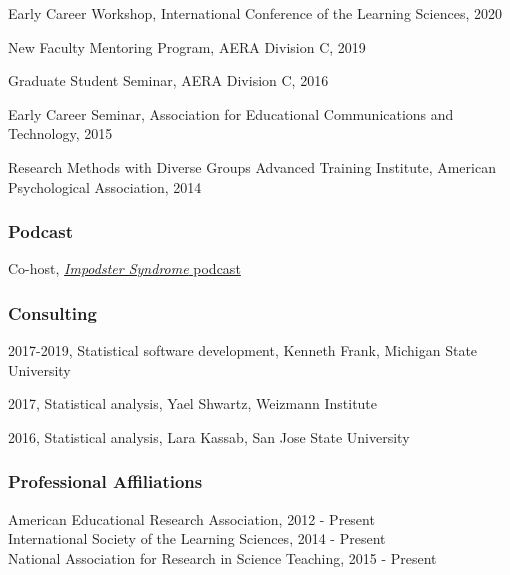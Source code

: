 \documentclass[
  11pt,
]{article}
\begin{document}
Early Career Workshop, International Conference of the Learning
Sciences, 2020

New Faculty Mentoring Program, AERA Division C, 2019

Graduate Student Seminar, AERA Division C, 2016

Early Career Seminar, Association for Educational Communications and
Technology, 2015

Research Methods with Diverse Groups Advanced Training Institute,
American Psychological Association, 2014

\hypertarget{podcast}{%
\subsubsection{Podcast}\label{podcast}}

Co-host, \href{http://impodstersyndrome.libsyn.com/}{\emph{Impodster
Syndrome} podcast}

\hypertarget{consulting}{%
\subsubsection{Consulting}\label{consulting}}

2017-2019, Statistical software development, Kenneth Frank, Michigan
State University

2017, Statistical analysis, Yael Shwartz, Weizmann Institute

2016, Statistical analysis, Lara Kassab, San Jose State University

\hypertarget{professional-affiliations}{%
\subsubsection{Professional
Affiliations}\label{professional-affiliations}}

American Educational Research Association, 2012 - Present\\
International Society of the Learning Sciences, 2014 - Present\\
National Association for Research in Science Teaching, 2015 - Present
\end{document}
